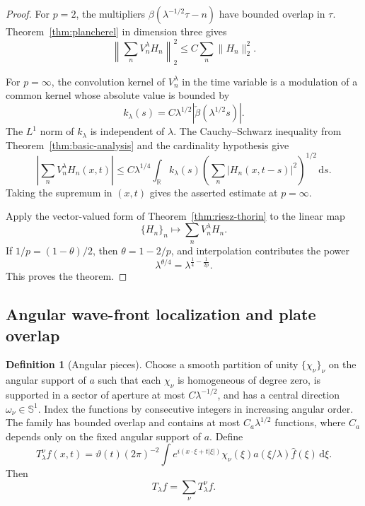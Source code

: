 \documentclass[11pt]{article}
\numberwithin{equation}{section}
\theoremstyle{definition}
\newtheorem{definition}[theorem]{Definition}
\theoremstyle{remark}
\newcommand{\R}{\mathbb R}
\newcommand{\Sph}{\mathbb S}
\newcommand{\dd}{\,\mathrm d}
\begin{document}
\begin{proof}
For $p=2$, the multipliers $\beta(\lambda^{-1/2}\tau-n)$ have bounded overlap in $\tau$.  Theorem~\ref{thm:plancherel} in dimension three gives
\[
\left\|\sum_nV_n^\lambda H_n\right\|_2^2
\le C\sum_n\|H_n\|_2^2.
\]

For $p=\infty$, the convolution kernel of $V_n^\lambda$ in the time variable is a modulation of a common kernel whose absolute value is bounded by
\[
k_\lambda(s)=C\lambda^{1/2}|\check\beta(\lambda^{1/2}s)|.
\]
The $L^1$ norm of $k_\lambda$ is independent of $\lambda$.  The Cauchy--Schwarz inequality from Theorem~\ref{thm:basic-analysis} and the cardinality hypothesis give
\[
\left|\sum_nV_n^\lambda H_n(x,t)\right|
\le C\lambda^{1/4}
\int_\R k_\lambda(s)
\left(\sum_n|H_n(x,t-s)|^2\right)^{1/2}\dd s.
\]
Taking the supremum in $(x,t)$ gives the asserted estimate at $p=\infty$.

Apply the vector-valued form of Theorem~\ref{thm:riesz-thorin} to the linear map
\[
\{H_n\}_n\longmapsto\sum_nV_n^\lambda H_n.
\]
If $1/p=(1-\theta)/2$, then $\theta=1-2/p$, and interpolation contributes the power
\[
\lambda^{\theta/4}=\lambda^{\frac14-\frac1{2p}}.
\]
This proves the theorem.
\end{proof}

\subsection{Angular wave-front localization and plate overlap}

\begin{definition}[Angular pieces]\label{def:mss-angular-pieces}
Choose a smooth partition of unity $\{\chi_\nu\}_\nu$ on the angular support of $a$ such that each $\chi_\nu$ is homogeneous of degree zero, is supported in a sector of aperture at most $C\lambda^{-1/2}$, and has a central direction $\omega_\nu\in\Sph^1$.  Index the functions by consecutive integers in increasing angular order.  The family has bounded overlap and contains at most $C_a\lambda^{1/2}$ functions, where $C_a$ depends only on the fixed angular support of $a$.  Define
\[
T_\lambda^\nu f(x,t)
=\vartheta(t)(2\pi)^{-2}\int e^{i(x\cdot\xi+t|\xi|)}
\chi_\nu(\xi)a(\xi/\lambda)\widehat f(\xi)\dd\xi.
\]
Then
\[
T_\lambda f=\sum_\nu T_\lambda^\nu f.
\]
\end{definition}
\end{document}
